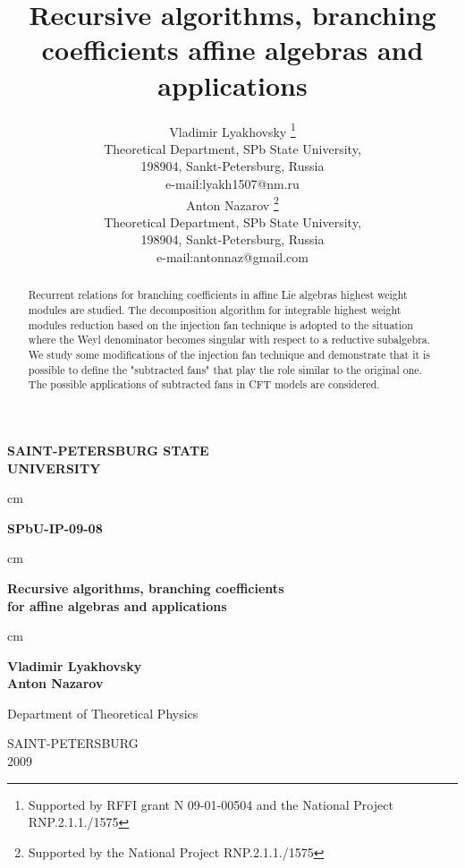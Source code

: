 \documentclass[a4paper,12pt]{article}
\theoremstyle{definition} \newtheorem{Def}{Definition}
\begin{document}
\thispagestyle{empty}

\begin{center}
{\Large \bf SAINT-PETERSBURG STATE\\[0.5cm] UNIVERSITY}
\end{center}
 cm
\begin{flushright}
{\large \bf SPbU-IP-09-08}
\end{flushright}
\hfill {}
 cm
\begin{center}
{\Huge \bf Recursive algorithms, branching coefficients \\ for affine algebras and applications\\[0.5cm]
}
\end{center}
 cm
\begin{center}
{\Large \bf
Vladimir Lyakhovsky\\[2mm]
Anton Nazarov}
\end{center}
\vfill
\begin{center}
{\large Department of Theoretical Physics\\
}
\end{center}
\vfill
\begin{center}
SAINT-PETERSBURG \\
2009
\end{center}

\newpage

\title{\textbf{{\Large {Recursive algorithms, branching coefficients affine algebras and applications}}}}
\author{Vladimir Lyakhovsky \thanks{ Supported by
 RFFI grant N 09-01-00504 and the National Project RNP.2.1.1./1575 }\\
Theoretical Department, SPb State University,\\
198904, Sankt-Petersburg, Russia \\
e-mail:lyakh1507@nm.ru \\
[5mm] Anton Nazarov \thanks{ Supported by
the National Project RNP.2.1.1./1575 }\\
Theoretical Department, SPb State University,\\
198904, Sankt-Petersburg, Russia \\
e-mail:antonnaz@gmail.com
}
\maketitle

\begin{abstract}
  Recurrent relations for branching coefficients in affine Lie algebras highest weight modules are studied. The decomposition algorithm for  integrable highest weight modules reduction based on the injection fan technique is adopted to the situation where the Weyl denominator becomes singular with respect to a reductive  subalgebra. We study some modifications of the injection fan technique and demonstrate that it is possible to define the "subtracted fans" that play the role similar to the original one. The possible applications of subtracted fans in CFT models are considered.
\end{abstract}
\end{document}
